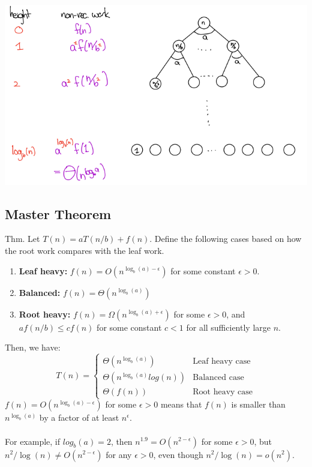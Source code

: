 \documentclass{article}
\begin{document}
\begin{center}
    \includegraphics[scale=0.6]{imgs/standard-form-tree.png}
\end{center}

\subsection{Master Theorem}
Thm. Let $T(n) = aT(n/b) + f(n)$. Define the following cases based on how the root work compares with the leaf work.
\begin{enumerate}
    \item \textbf{Leaf heavy:} $f(n) = O(n^{\log_b(a) - \epsilon})$ for some constant $\epsilon > 0$.
    \item \textbf{Balanced:} $f(n) = \Theta(n^{\log_b(a)})$
    \item \textbf{Root heavy:} $f(n) = \Omega(n^{\log_b(a) + \epsilon})$ for some $\epsilon > 0$, and $a f(n/b) \leq cf(n)$ for some constant $c < 1$ for all sufficiently large $n$. 
\end{enumerate}
Then, we have:
$$T(n) = \begin{cases}
\Theta(n^{\log_b(a)}) & \text{Leaf heavy case}\\
\Theta(n^{\log_b(a)} log(n)) & \text{Balanced case}\\
\Theta(f(n)) & \text{Root heavy case}
\end{cases}$$
$f(n) = O(n^{\log_b(a) - \epsilon})$ for some $\epsilon > 0$ means that $f(n)$ is smaller than $n^{\log_b(a)}$ by a factor of at least $n^\epsilon$.\\\\
For example, if $log_b(a) = 2$, then $n^{1.9} = O(n^{2 - \epsilon})$ for some $\epsilon >0$, but $n^2/\log(n) \neq O(n^{2-\epsilon})$ for any $\epsilon > 0$, even though $n^2/\log(n) = o(n^2)$.
\end{document}
